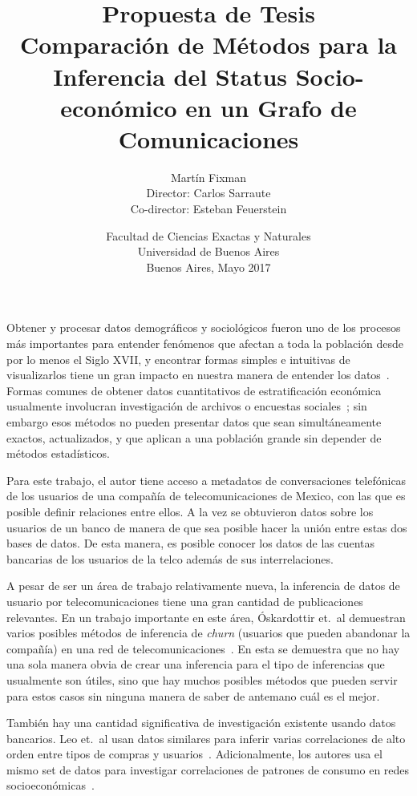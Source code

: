 \documentclass{article}
\title{Propuesta de Tesis\\\vspace{1em}\Large 
Comparación de Métodos para la Inferencia
del Status Socio-económico en un Grafo de Comunicaciones}
\author{{\Large Martín Fixman}\\Director: Carlos Sarraute\\Co-director: Esteban Feuerstein}
\date{{Facultad de Ciencias Exactas y Naturales}\\{Universidad de Buenos Aires}\\Buenos Aires, Mayo 2017}
\begin{document}
\maketitle

\section*{}

Obtener y procesar datos demográficos y sociológicos fueron uno de los procesos más importantes para entender fenómenos que afectan a toda la población desde por lo menos el Siglo XVII, y encontrar formas simples e intuitivas de visualizarlos tiene un gran impacto en nuestra manera de entender los datos~\citep{minard1844,snow1855}. Formas comunes de obtener datos cuantitativos de estratificación económica usualmente involucran investigación de archivos o encuestas sociales~\citep{bulmer1977}; sin embargo esos métodos no pueden presentar datos que sean simultáneamente exactos, actualizados, y que aplican a una población grande sin depender de métodos estadísticos.

Para este trabajo, el autor tiene acceso a metadatos de conversaciones telefónicas de los usuarios de una compañía de telecomunicaciones de Mexico, con las que es posible definir relaciones entre ellos. A la vez se obtuvieron datos sobre los usuarios de un banco de manera de que sea posible hacer la unión entre estas dos bases de datos. De esta manera, es posible conocer los datos de las cuentas bancarias de los usuarios de la telco además de sus interrelaciones.

A pesar de ser un área de trabajo relativamente nueva, la inferencia de datos de usuario por telecomunicaciones tiene una gran cantidad de publicaciones relevantes. En un trabajo importante en este área, Óskardottir et.\ al demuestran varios posibles métodos de inferencia de \emph{churn} (usuarios que pueden abandonar la compañía) en una red de telecomunicaciones~\cite{oskardottir2016}. En esta se demuestra que no hay una sola manera obvia de crear una inferencia para el tipo de inferencias que usualmente son útiles, sino que hay muchos posibles métodos que pueden servir para estos casos sin ninguna manera de saber de antemano cuál es el mejor.

También hay una cantidad significativa de investigación existente usando datos bancarios. Leo et.\ al usan datos similares para inferir varias correlaciones de alto orden entre tipos de compras y usuarios~\cite{leo2015socioeconomic}. Adicionalmente, los autores usa el mismo set de datos para investigar correlaciones de patrones de consumo en redes socioeconómicas~\cite{leo16correlations}.
\end{document}
